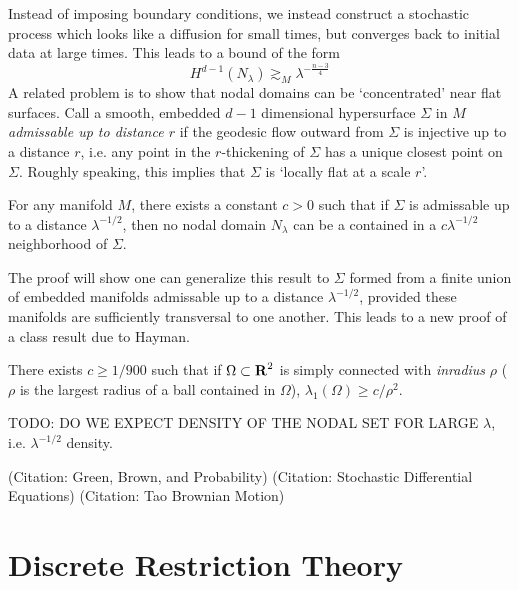 Instead of imposing boundary conditions, we instead construct a stochastic process which looks like a diffusion for small times, but converges back to initial data at large times. This leads to a bound of the form
%
\[ H^{d-1}(N_\lambda) \gtrsim_M \lambda^{- \frac{n-3}{4}} \]
%
A related problem is to show that nodal domains can be `concentrated' near flat surfaces. Call a smooth, embedded $d-1$ dimensional hypersurface $\Sigma$ in $M$ \emph{admissable up to distance $r$} if the geodesic flow outward from $\Sigma$ is injective up to a distance $r$, i.e. any point in the $r$-thickening of $\Sigma$ has a unique closest point on $\Sigma$. Roughly speaking, this implies that $\Sigma$ is `locally flat at a scale $r$'.

\begin{theorem}
    For any manifold $M$, there exists a constant $c > 0$ such that if $\Sigma$ is admissable up to a distance $\lambda^{-1/2}$, then no nodal domain $N_\lambda$ can be a contained in a $c \lambda^{-1/2}$ neighborhood of $\Sigma$.
\end{theorem}

The proof will show one can generalize this result to $\Sigma$ formed from a finite union of embedded manifolds admissable up to a distance $\lambda^{-1/2}$, provided these manifolds are sufficiently transversal to one another. This leads to a new proof of a class result due to Hayman.

\begin{corollary}
    There exists $c \geq 1/900$ such that if $\Omega \subset \operatorname{\mathbf{R}}^2$ is simply connected with \emph{inradius} $\rho$ ($\rho$ is the largest radius of a ball contained in $\Omega$), $\lambda_1(\Omega) \geq c/\rho^2$.
\end{corollary}

TODO: DO WE EXPECT DENSITY OF THE NODAL SET FOR LARGE $\lambda$, i.e. $\lambda^{-1/2}$ density.

(Citation: Green, Brown, and Probability)
(Citation: Stochastic Differential Equations)
(Citation: Tao Brownian Motion)

















\section{Discrete Restriction Theory}

